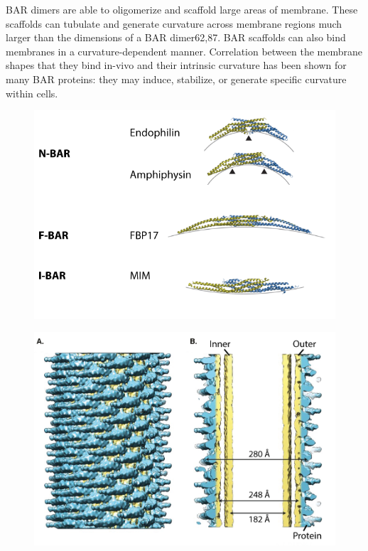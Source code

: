 \vspace{5mm}
BAR dimers are able to oligomerize and scaffold large areas of membrane. These scaffolds can tubulate and generate curvature across membrane regions much larger than the dimensions of a BAR dimer62,87. BAR scaffolds can also bind membranes in a curvature-dependent manner. Correlation between the membrane shapes that they bind in-vivo and their intrinsic curvature has been shown for many BAR proteins: they may induce, stabilize, or generate specific curvature within cells. 

\begin{figure}[H]
	\centering
	\includegraphics[scale=0.6]{figures/intro/BAR_structures}
\end{figure}
		
\begin{figure}[H]
	\centering
	\includegraphics[scale=0.4]{figures/intro/BAR_scaffold}
	\end{figure}



